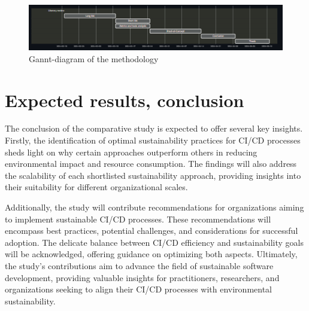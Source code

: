 \begin{figure}
    \centering
    \includegraphics[width=0.8\linewidth]
    {graphics/Gantt.png}
    \caption{\label{fig:protocol}Gannt-diagram of the methodology}
\end{figure}

\section{Expected results, conclusion}%
\label{sec:verwachte_resultaten}

The conclusion of the comparative study is expected to offer several key insights. Firstly, the identification of optimal sustainability practices for CI/CD processes sheds light on why certain approaches outperform others in reducing environmental impact and resource consumption. The findings will also address the scalability of each shortlisted sustainability approach, providing insights into their suitability for different organizational scales.

Additionally, the study will contribute recommendations for organizations aiming to implement sustainable CI/CD processes. These recommendations will encompass best practices, potential challenges, and considerations for successful adoption. The delicate balance between CI/CD efficiency and sustainability goals will be acknowledged, offering guidance on optimizing both aspects. Ultimately, the study's contributions aim to advance the field of sustainable software development, providing valuable insights for practitioners, researchers, and organizations seeking to align their CI/CD processes with environmental sustainability.









